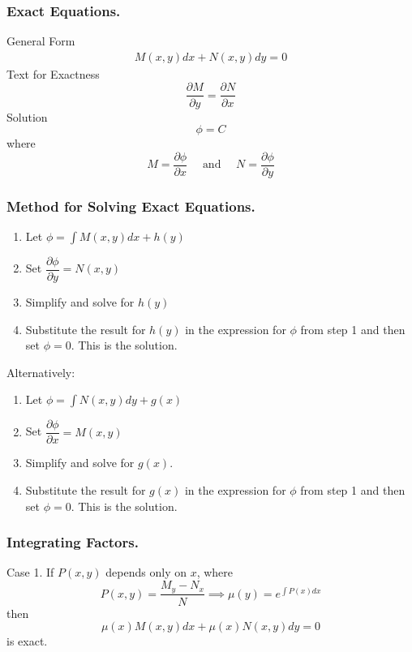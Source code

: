 \documentclass[../../main.tex]{subfiles}
\begin{document}
\subsubsection*{Exact Equations.} General Form
\begin{align*}
M(x,y)dx + N(x,y)dy = 0 
\end{align*}
Text for Exactness
\begin{equation*}
\dfrac{\partial M}{\partial y}=\dfrac{\partial N}{\partial x}
\end{equation*}
Solution
\begin{equation*}
\phi=C
\end{equation*}
where
\begin{equation*}
M=\dfrac{\partial \phi}{\partial x}\quad\text{ and }\quad N=\dfrac{\partial \phi}{\partial y}
\end{equation*}

\subsubsection*{Method for Solving Exact Equations. }

\begin{enumerate}
\item Let $\phi=\int M(x,y)dx + h(y)$
\item Set $\dfrac{\partial \phi}{\partial y} = N(x,y)$
\item Simplify and solve for $h(y)$
\item  Substitute the result for $h(y)$ in the expression for $\phi$ from step 1 and then set $\phi=0$. This is the solution. 
\end{enumerate}

Alternatively: 
\begin{enumerate}
\item Let $\phi=\int N(x,y)dy + g(x)$
\item Set $\dfrac{\partial \phi}{\partial x} = M(x,y)$
\item Simplify and solve for $g(x)$. 
\item Substitute the result for $g(x)$ in the expression for $\phi$ from step 1 and then set $\phi=0$. This is the solution. 
\end{enumerate}

\subsubsection*{Integrating Factors.} Case 1. If $P(x,y)$ depends only on $x$, where
\begin{equation*}
P(x,y)=\dfrac{M_y-N_x}{N} \implies \mu(y) = e^{\int P(x)dx}
\end{equation*}
then
\begin{equation*}
\mu(x) M(x,y) dx + \mu(x) N(x,y) dy = 0
\end{equation*}
is exact.
\end{document}
